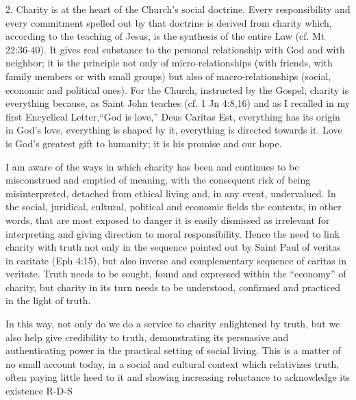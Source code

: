 \documentclass[oneside]{book}
\begin{document}
2. Charity is at the heart of the Church's social doctrine. Every responsibility
and every commitment spelled out by that doctrine is derived from charity which,
according to the teaching of Jesus, is the synthesis of the entire Law (cf. Mt
22:36-40). It gives real substance to the personal relationship with God and
with neighbor; it is the principle not only of micro-relationships (with
friends, with family members or with small groups) but also of
macro-relationships (social, economic and political ones). For the Church,
instructed by the Gospel, charity is everything because, as Saint John teaches
(cf. 1 Jn 4:8,16) and as I recalled in my first Encyclical Letter,``God is
love,'' Deus Caritas Est, everything has its origin in God's love, everything is
shaped by it, everything is directed towards it. Love is God's greatest gift to
humanity; it is his promise and our hope.

I am aware of the ways in which charity has been and continues to be
misconstrued and emptied of meaning, with the consequent risk of being
misinterpreted, detached from ethical living and, in any event, undervalued. In
the social, juridical, cultural, political and economic fields  the contents, in
other words, that are most exposed to danger  it is easily dismissed as
irrelevant for interpreting and giving direction to moral responsibility. Hence
the need to link charity with truth not only in the sequence pointed out by
Saint Paul of veritas in caritate (Eph 4:15), but also inverse and complementary
sequence of caritas in veritate. Truth needs to be sought, found and expressed
within the ``economy'' of charity, but charity in its turn needs to be
understood, confirmed and practiced in the light of truth.

In this way, not only do we do a service to charity enlightened by truth, but we
also help give credibility to truth, demonstrating its persuasive and
authenticating power in the practical setting of social living. This is a matter
of no small account today, in a social and cultural context which relativizes
truth, often paying little heed to it and showing increasing reluctance to
acknowledge its existence
R-D-S
\end{document}
